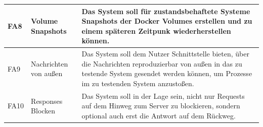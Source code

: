 \documentclass[12pt,a4paper]{report}
\begin{document}
\begin{table}[H]
\begin{tabular}{|l|l|p{7cm}|}
		FA8  & Volume Snapshots              & Das System soll für zustandsbehaftete Systeme Snapshots der Docker Volumes erstellen und zu einem späteren Zeitpunk wiederherstellen können.                                                                          \\ \hline
		FA9  & Nachrichten von außen         & Das System soll dem Nutzer Schnittstelle bieten, über die Nachrichten reproduzierbar von außen in das zu testende System gesendet werden können, um Prozesse im zu testenden System anzustoßen.                       \\ \hline
		FA10 & Responses Blocken             & Das System soll in der Lage sein, nicht nur Requests auf dem Hinweg zum Server zu blockieren, sondern optional auch erst die Antwort auf dem Rückweg.                                                                 \\ \hline
	\end{tabular}
\end{table}
\end{document}
